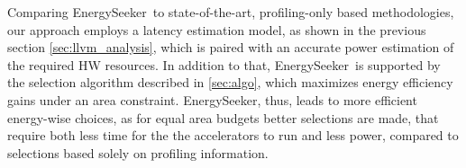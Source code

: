\documentclass[]{usiinfthesis}
\newcommand{\eseeker}{{EnergySeeker}}
\newcommand{\SoTA}{{state-of-the-art}}
\begin{document}
Comparing \eseeker\ to \SoTA, profiling-only based methodologies,
our approach employs a latency estimation model, as shown in the previous 
section \ref{sec:llvm_analysis}, which is paired with an accurate power estimation of the required HW resources. 
In addition to that, \eseeker\ is supported by the selection algorithm described in \ref{sec:algo}, which maximizes
energy efficiency gains under an area constraint. \eseeker, thus, leads to more efficient energy-wise choices, as for equal area budgets better selections are made, that require both less time for the the accelerators to run and less power, compared to selections based solely on profiling information.
\end{document}
